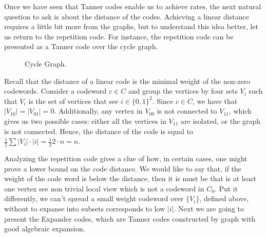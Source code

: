   Once we have seen that Tanner codes enable us to achieve rates, the next natural question to ask is about the distance of the codes. Achieving a linear distance requires a little bit more from the graphs, but to understand this idea better, let us return to the repetition code. For instance, the repetition code can be presented as a Tanner code over the cycle graph.  

 
 \begin{center}
  \begin{figure}[H]
  \caption{Cycle Graph.} 
  \label{fig:cyc}
\end{figure}
\end{center}

Recall that the distance of a linear code is the minimal weight of the non-zero codewords. Consider a codeword $c \in C$ and group the vertices by four sets $V_i$ such that $V_i$ is the set of vertices that see $i \in \{0,1\}^{2}$. Since $c \in C$, we have that $|V_{10}|=|V_{01}| = 0$. Additionally, any vertex in $V_{00}$ is not connected to $V_{11}$, which gives us two possible cases: either all the vertices in $V_{11}$ are isolated, or the graph is not connected. Hence, the distance of the code is equal to $\frac{1}{2}\sum{|V_{i}|\cdot |i|} = \frac{1}{2}2 \cdot n = n$.

Analyzing the repetition code gives a clue of how, in certain cases, one might prove a lower bound on the code distance. We would like to say that, if the weight of the code word is below the distance, then it is must be that is at least one vertex see non trivial local view which is not a codeword in $C_{0}$. Put it differently, we can't spread a small weight codeword over $\{V_{i}\}$, defined above, without to expanse into subsets corresponds to low $|i|$. Next we are going to present the Expander codes, which are Tanner codes constructed by graph with good algebraic expansion.   



